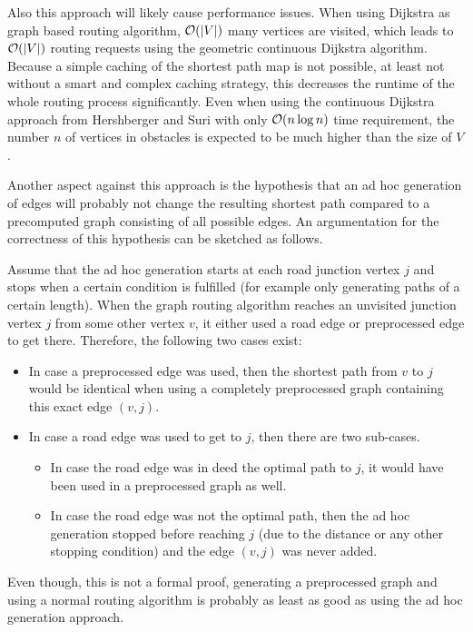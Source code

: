 		Also this approach will likely cause performance issues.
		When using Dijkstra as graph based routing algorithm, $\mathcal{O}(|V|)$ many vertices are visited, which leads to $\mathcal{O}(|V|)$ routing requests using the geometric continuous Dijkstra algorithm.
		Because a simple caching of the shortest path map is not possible, at least not without a smart and complex caching strategy, this decreases the runtime of the whole routing process significantly.
		Even when using the continuous Dijkstra approach from Hershberger and Suri \cite{hershberger-suri} with only $\mathcal{O}(n \log n)$ time requirement, the number $n$ of vertices in obstacles is expected to be much higher than the size of $V$.
		
		Another aspect against this approach is the hypothesis that an ad hoc generation of edges will probably not change the resulting shortest path compared to a precomputed graph consisting of all possible edges.
		An argumentation for the correctness of this hypothesis can be sketched as follows.
		
		Assume that the ad hoc generation starts at each road junction vertex $j$ and stops when a certain condition is fulfilled (for example only generating paths of a certain length).
		When the graph routing algorithm reaches an unvisited junction vertex $j$ from some other vertex $v$, it either used a road edge or preprocessed edge to get there. Therefore, the following two cases exist:
		\begin{itemize}
			\item In case a preprocessed edge was used, then the shortest path from $v$ to $j$ would be identical when using a completely preprocessed graph containing this exact edge $(v, j)$.
			\item In case a road edge was used to get to $j$, then there are two sub-cases.
			\begin{itemize}
				\item In case the road edge was in deed the optimal path to $j$, it would have been used in a preprocessed graph as well.
				\item In case the road edge was not the optimal path, then the ad hoc generation stopped before reaching $j$ (due to the distance or any other stopping condition) and the edge $(v, j)$ was never added.
			\end{itemize}
		\end{itemize}
		Even though, this is not a formal proof, generating a preprocessed graph and using a normal routing algorithm is probably as least as good as using the ad hoc generation approach.
	
